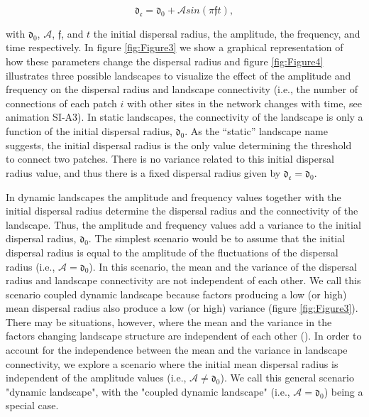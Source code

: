 \documentclass[12pt]{article}
\begin{document}
\begin{equation}
\mathfrak{d_{c}} = \mathfrak{d_{0}} + \mathcal{A} sin (\pi \mathfrak{f} t),
\label{eq:ratioAf}
\end{equation}

with $\mathfrak{d_{0}}$, $\mathcal{A}$, $\mathfrak{f}$, and $t$ the initial
dispersal radius, the amplitude, the frequency, and time respectively. In
figure \ref{fig:Figure3} we show a graphical representation of how these
parameters change the dispersal radius and figure \ref{fig:Figure4} illustrates three possible landscapes to visualize the effect of the amplitude and frequency on the dispersal radius and landscape
connectivity (i.e., the number of connections of each patch $i$ with other sites in
the network changes with time, see animation SI-A3). In static landscapes, the
connectivity of the landscape is only a function of the initial dispersal
radius, $\mathfrak{d_{0}}$. As the ``static'' landscape name suggests, the
initial dispersal radius is the only value determining the threshold to connect
two patches. There is no variance related to this initial dispersal radius
value, and thus there is a fixed dispersal radius given by $\mathfrak{d_{c}} =
\mathfrak{d_{0}}$.

In dynamic landscapes the amplitude and frequency values
together with the initial dispersal radius determine the dispersal
radius and the connectivity of the landscape. Thus, the amplitude and frequency
values add a variance to the initial dispersal radius, $\mathfrak{d_{0}}$. The simplest scenario
would be to assume that the initial dispersal radius is equal to the
amplitude of the fluctuations of the dispersal radius (i.e.,
$\mathcal{A} = \mathfrak{d_{0}}$). In this scenario, the mean and the
variance of the dispersal radius and landscape connectivity are not
independent of each other. We call this scenario coupled dynamic
landscape because factors producing a low (or high) mean dispersal
radius also produce a low (or high) variance (figure \ref{fig:Figure3}). There may be
situations, however, where the mean and the variance in the factors
changing landscape structure are independent of each other
(\cite{Violletal2012}). In order to account for the independence between the mean and the variance in landscape connectivity, we explore a scenario where the initial mean dispersal radius is
independent of the amplitude values (i.e., $\mathcal{A} \neq
\mathfrak{d_{0}}$). We call this general scenario "dynamic landscape", with the "coupled dynamic landscape" (i.e., $\mathcal{A} = \mathfrak{d_{0}}$) being a special case.
\end{document}

